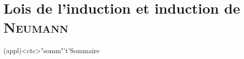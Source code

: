 \documentclass[../../main/main.tex]{subfiles}
\begin{document}
\setcounter{chapter}{2}


\chapter{Lois de l'induction et induction de \textsc{Neumann}}
\label{ch:loisinduc}

\vspace*{\fill}

\begin{tcn}(appl)<ctc>"somm"'t'{Sommaire}
	\let\item\olditem
	\vspace{-15pt}
	\minitoc
	\vspace{-25pt}
\end{tcn}
\end{document}

